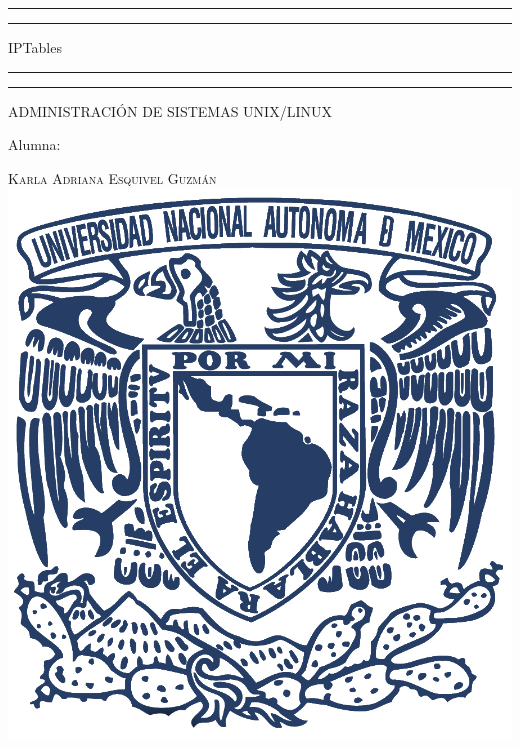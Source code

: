 \documentclass[a4paper, 11pt, oneside]{article}
\begin{document}
 

\begin{titlepage} 

	\centering 
	
	\scshape 
	
	\vspace*{\baselineskip} 
	
	
	
	\rule{\textwidth}{1.6pt}\vspace*{-\baselineskip}\vspace*{2pt} 
	\rule{\textwidth}{0.4pt} 
	
	\vspace{0.75\baselineskip} 
	
	{\LARGE IPTables}	
	\vspace{0.75\baselineskip} 
	
	\rule{\textwidth}{0.4pt}\vspace*{-\baselineskip}\vspace{3.2pt}
	\rule{\textwidth}{1.6pt} 
	
	\vspace{2\baselineskip} 
	

	ADMINISTRACIÓN DE SISTEMAS UNIX/LINUX
	
	\vspace*{3\baselineskip} 
	
	
	
	Alumna:
	
	\vspace{0.5\baselineskip} 
	
	{\scshape\Large Karla Adriana Esquivel Guzmán \\} 
	\vspace{0.5\baselineskip} 
	\vfill
	\includegraphics{unam.jpg}
	

\end{titlepage}
\end{document}
